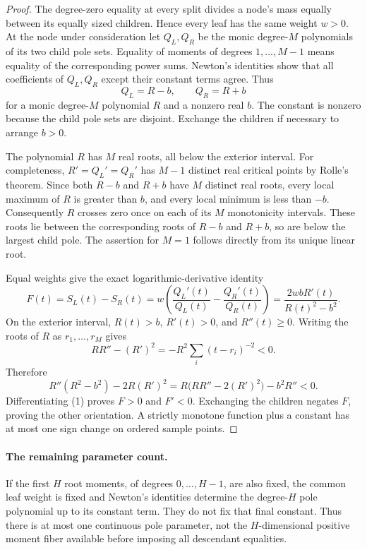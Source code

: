 \documentclass[11pt]{article}
\begin{document}
\begin{proof}
The degree-zero equality at every split divides a node's mass equally
between its equally sized children. Hence every leaf has the same weight
$w>0$. At the node under consideration let $Q_L,Q_R$ be the monic
degree-$M$ polynomials of its two child pole sets. Equality of moments
of degrees $1,\ldots,M-1$ means equality of the corresponding power sums.
Newton's identities show that all coefficients of $Q_L,Q_R$ except
their constant terms agree. Thus
\[
 Q_L=R-b,\qquad Q_R=R+b
\]
for a monic degree-$M$ polynomial $R$ and a nonzero real $b$.
The constant is nonzero because the child pole sets are disjoint.
Exchange the children if necessary to arrange $b>0$.

The polynomial $R$ has $M$ real roots, all below the exterior interval.
For completeness, $R'=Q_L'=Q_R'$ has $M-1$ distinct real critical
points by Rolle's theorem. Since both $R-b$ and $R+b$ have $M$ distinct
real roots, every local maximum of $R$ is greater than $b$, and every
local minimum is less than $-b$. Consequently $R$ crosses zero once on
each of its $M$ monotonicity intervals. These roots lie between the
corresponding roots of $R-b$ and $R+b$, so are below the largest child pole.
The assertion for $M=1$ follows directly from its unique linear root.

Equal weights give the exact logarithmic-derivative identity
\[
 F(t)=S_L(t)-S_R(t)
 =w\left(\frac{Q_L'(t)}{Q_L(t)}-\frac{Q_R'(t)}{Q_R(t)}\right)
 =\frac{2wbR'(t)}{R(t)^2-b^2}.                         \tag{1}
\]
On the exterior interval, $R(t)>b$, $R'(t)>0$, and $R''(t)\geq0$.
Writing the roots of $R$ as $r_1,\ldots,r_M$ gives
\[
 RR''-(R')^2=-R^2\sum_i(t-r_i)^{-2}<0.
\]
Therefore
\[
 R''(R^2-b^2)-2R(R')^2
 =R\bigl(RR''-2(R')^2\bigr)-b^2R''<0.
\]
Differentiating (1) proves $F>0$ and $F'<0$. Exchanging the children
negates $F$, proving the other orientation. A strictly monotone function
plus a constant has at most one sign change on ordered sample points.
\end{proof}

\paragraph{The remaining parameter count.}
If the first $H$ root moments, of degrees $0,\ldots,H-1$, are also
fixed, the common leaf weight is fixed and Newton's identities determine
the degree-$H$ pole polynomial up to its constant term. They do not fix
that final constant. Thus there is at most one continuous pole parameter,
not the $H$-dimensional positive moment fiber available before imposing
all descendant equalities.
\end{document}
